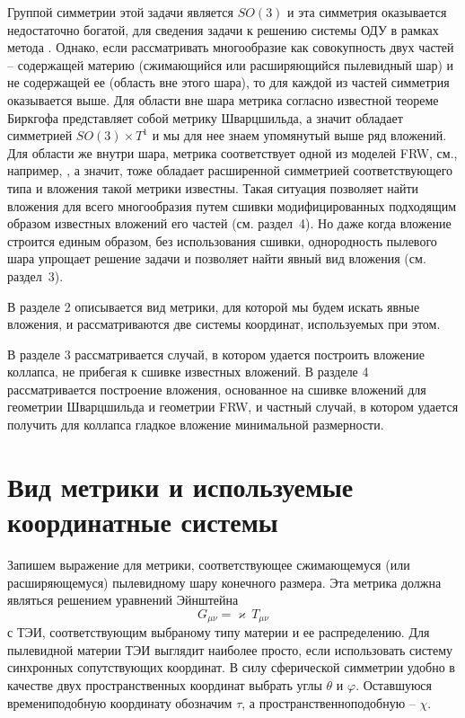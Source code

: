 \documentclass[12pt]{article}
\begin{document}
Группой симметрии этой задачи является $SO(3)$ и эта симметрия оказывается недостаточно богатой, для сведения задачи
к решению системы ОДУ в рамках метода \cite{statja27}. Однако, если рассматривать многообразие как совокупность двух частей --
содержащей материю (сжимающийся или расширяющийся пылевидный шар) и не содержащей ее (область вне этого шара), то для каждой
из частей симметрия оказывается выше. Для области вне шара метрика согласно известной теореме Биркгофа
представляет собой метрику Шварцшильда, а значит обладает симметрией $SO(3)\times T^1$ и мы для нее знаем
упомянутый выше ряд вложений. Для области же внутри шара, метрика соответствует одной из моделей FRW, см., например, \cite{landavshic2},
а значит, тоже обладает расширенной симметрией соответствующего типа и вложения такой метрики известны.
Такая ситуация позволяет найти вложения для всего многообразия путем сшивки модифицированных подходящим образом
известных вложений его частей (см. раздел~4). Но даже когда вложение строится единым образом, без использования сшивки,
однородность пылевого шара упрощает решение задачи и позволяет найти явный вид вложения (см. раздел~3).

В разделе 2 описывается вид метрики, для которой мы будем искать явные вложения,
и рассматриваются две системы координат, используемых при этом.









В разделе 3 рассматривается случай, в котором удается построить вложение коллапса, не прибегая к сшивке известных вложений. В разделе 4 рассматривается построение вложения, основанное на сшивке вложений для геометрии Шварцшильда и геометрии FRW, и частный случай, в котором удается получить для коллапса гладкое вложение минимальной размерности.




\section{Вид метрики и используемые координатные системы}
Запишем выражение для метрики, соответствующее сжимающемуся (или расширяющемуся) пылевидному шару конечного размера.
Эта метрика должна являться решением уравнений Эйнштейна
\begin{equation}
\label{G=T}
	G_{\mu \nu} = \varkappa\, T_{\mu \nu}
\end{equation}
с ТЭИ, соответствующим выбраному типу материи и ее распределению.
Для пылевидной материи ТЭИ выглядит наиболее просто, если использовать систему синхронных сопутствующих координат.
В силу сферической симметрии удобно в качестве двух пространственных координат выбрать углы $\theta$ и $\varphi$.
Оставшуюся времениподобную координату обозначим $\tau$, а пространственноподобную -- $\chi$.
\end{document}
